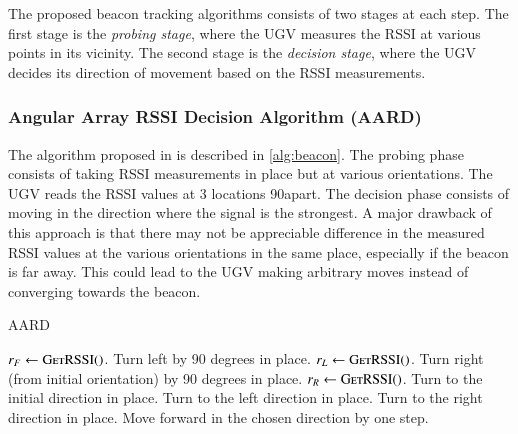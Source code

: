 \documentclass[conference]{IEEEtran}
\begin{document}
The proposed beacon tracking algorithms consists of two stages at each step. The
first stage is the \emph{probing stage}, where the UGV measures the RSSI at
various points in its vicinity. The second stage is the \emph{decision stage},
where the UGV decides its direction of movement based on the RSSI measurements.
%
\subsubsection{Angular Array RSSI Decision Algorithm (AARD)}
\label{subsubsec:existing-algorithm}

The algorithm proposed in \cite{NavigationCommunicationUGV2022} is
described in \autoref{alg:beacon}. The probing phase consists of taking
RSSI measurements in place but at various orientations. The UGV reads the RSSI
values at 3 locations 90\degree apart.  The decision phase consists of moving in
the direction where the signal is the strongest. A major drawback of this
approach is that there may not be appreciable difference in the measured RSSI
values at the various orientations in the same place, especially if the beacon
is far away. This could lead to the UGV making arbitrary moves instead of
converging towards the beacon.

\begin{algorithm}[H]
    \caption{AARD}
    \label{alg:beacon}
    \begin{algorithmic}[1]
            \State \(r_F \gets \textsc{GetRSSI()}\).
            \State Turn left by 90 degrees in place.
            \State \(r_L \gets \textsc{GetRSSI()}\).
            \State Turn right (from initial orientation) by 90 degrees in place.
            \State \(r_R \gets \textsc{GetRSSI()}\).
                \State Turn to the initial direction in place.
                \State Turn to the left direction in place.
                \State Turn to the right direction in place.
            \EndIf
            \State Move forward in the chosen direction by one step.
        \EndWhile
    \end{algorithmic}
\end{algorithm}
\end{document}
